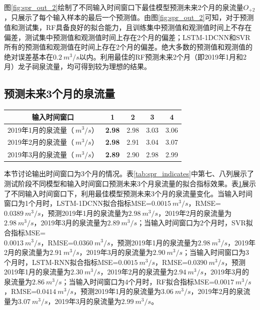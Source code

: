 图\ref{fig:spr_out_2}绘制了不同输入时间窗口下最佳模型预测未来2个月的泉流量$O_{+2}$，只展示了每个输入样本的最后一个预测值。由图\ref{fig:spr_out_2}可知，对于预测值和测试集，RF具备良好的拟合能力，且训练集中预测值和观测值时间上不存在偏差，测试集中预测值和观测值时间上存在2个月的偏差；LSTM-1DCNN和SVR所有的预测值和观测值在时间上存在2个月的偏差。绝大多数的预测值和观测值的绝对误差基本在$\SI{0.2}{m^{3}/s}$以内。利用最佳的RF预测未来2个月（即2019年1月和2月）龙子祠泉流量，均可得到较为理想的结果。

\subsection{预测未来3个月的泉流量}\label{sec:spr_three}

\begin{table}[!htbp]
  \centering
  \label{tab:spr_three}
  \footnotesize
  \begin{tabular}{ccccc}
    \toprule
    输入时间窗口 & 1 & 2 & 3 & 4 \\
    \midrule
    2019年1月的泉流量（$\SI{}{m^{3}/s}$）& \textbf{2.98} & 2.98 & 3.03 & 3.06  \\
    2019年2月的泉流量（$\SI{}{m^{3}/s}$）& \textbf{2.98} & 2.91 & 3.04 & 3.07  \\
    2019年3月的泉流量（$\SI{}{m^{3}/s}$）& \textbf{2.89} & 2.90 & 2.98 & 2.99  \\
    \bottomrule
  \end{tabular}
\end{table}

本节讨论输出时间窗口为3个月的情况。表\ref{tab:spr_indicates}中第七、八列展示了测试阶段不同模型和输入时间窗口预测未来3个月泉流量的拟合指标效果。表\ref{tab:spr_three}展示了不同输入时间窗口下，利用最佳模型预测未来3个月的泉流量变化。当输入时间窗口为1个月时，LSTM-1DCNN拟合指标MSE=$\SI{0.0015}{m^{3}/s}$，RMSE=$\SI{0.0389}{m^{3}/s}$，预测2019年1月的泉流量为$\SI{2.98}{m^{3}/s}$，2019年2月的泉流量为$\SI{2.98}{m^{3}/s}$，2019年3月的泉流量为$\SI{2.89}{m^{3}/s}$；当输入时间窗口为2个月时，SVR拟合指标MSE=\\$\SI{0.0013}{m^{3}/s}$，RMSE=$\SI{0.0360}{m^{3}/s}$，预测2019年1月的泉流量为$\SI{2.98}{m^{3}/s}$，2019年2月的泉流量为$\SI{2.91}{m^{3}/s}$，2019年3月的泉流量为$\SI{2.90}{m^{3}/s}$；当输入时间窗口为3个月时，LSTM-RNN拟合指标MSE=$\SI{0.0015}{m^{3}/s}$，RMSE=$\SI{0.0390}{m^{3}/s}$，预测2019年1月的泉流量为$\SI{2.30}{m^{3}/s}$，2019年2月的泉流量为$\SI{2.94}{m^{3}/s}$，2019年3月的泉流量为$\SI{2.86}{m^{3}/s}$；当输入时间窗口为4个月时，RF拟合指标MSE=$\SI{0.0017}{m^{3}/s}$，RMSE=$\SI{0.0414}{m^{3}/s}$，预测2019年1月的泉流量为$\SI{3.06}{m^{3}/s}$，2019年2月的泉流量为$\SI{3.07}{m^{3}/s}$，2019年3月的泉流量为$\SI{2.99}{m^{3}/s}$。

